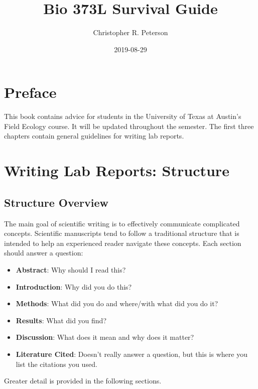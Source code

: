 \documentclass[]{book}
\title{Bio 373L Survival Guide}
\author{Christopher R. Peterson}
\date{2019-08-29}
\providecommand{\tightlist}{%
  \setlength{\itemsep}{0pt}\setlength{\parskip}{0pt}}
\begin{document}
\maketitle

{
\setcounter{tocdepth}{1}
\tableofcontents
}
\chapter*{Preface}\label{preface}

This book contains advice for students in the University of Texas at
Austin's Field Ecology course. It will be updated throughout the
semester. The first three chapters contain general guidelines for
writing lab reports.

\chapter{Writing Lab Reports: Structure}\label{structure}

\section{Structure Overview}\label{structure-overview}

The main goal of scientific writing is to effectively communicate
complicated concepts. Scientific manuscripts tend to follow a
traditional structure that is intended to help an experienced reader
navigate these concepts. Each section should answer a question:

\begin{itemize}
\tightlist
\item
  \textbf{Abstract}: Why should I read this?
\item
  \textbf{Introduction}: Why did you do this?\\
\item
  \textbf{Methods}: What did you do and where/with what did you do it?
\item
  \textbf{Results}: What did you find?\\
\item
  \textbf{Discussion}: What does it mean and why does it matter?
\item
  \textbf{Literature Cited}: Doesn't really answer a question, but this
  is where you list the citations you used.
\end{itemize}

Greater detail is provided in the following sections.
\end{document}
